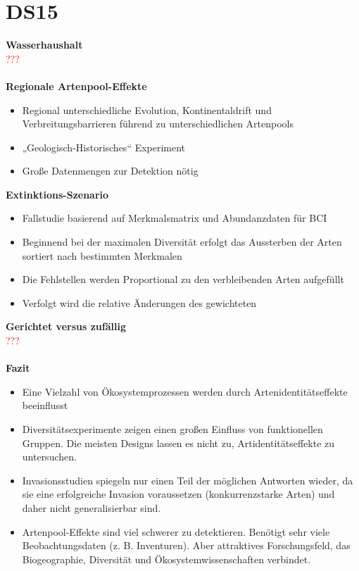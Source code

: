 \section{DS15}

\textbf{Wasserhaushalt}\\
\textcolor{red}{???}
\\\\
\textbf{Regionale Artenpool-Effekte}
\begin{itemize}
	\item Regional unterschiedliche Evolution, Kontinentaldrift und Verbreitungsbarrieren führend zu unterschiedlichen Artenpools
	\item „Geologisch-Historisches“ Experiment
	\item Große Datenmengen zur Detektion nötig
\end{itemize}

\textbf{Extinktions-Szenario}
\begin{itemize}
	\item Fallstudie basierend auf Merkmalsmatrix und Abundanzdaten für BCI
	\item Beginnend bei der maximalen Diversität erfolgt das Aussterben der Arten sortiert nach bestimmten Merkmalen
	\item Die Fehlstellen werden Proportional zu den verbleibenden Arten aufgefüllt
	\item Verfolgt wird die relative Änderungen des gewichteten
\end{itemize}

\textbf{Gerichtet versus zufällig}\\
\textcolor{red}{???}
\\\\
\textbf{Fazit}
\begin{itemize}
	\item Eine Vielzahl von Ökosystemprozessen werden durch Artenidentitätseffekte beeinflusst
	\item Diversitätsexperimente zeigen einen großen Einfluss von funktionellen Gruppen. Die meisten Designs lassen es nicht zu, Artidentitätseffekte zu untersuchen.
	\item Invasionsstudien spiegeln nur einen Teil der möglichen Antworten wieder, da sie eine erfolgreiche Invasion voraussetzen (konkurrenzstarke Arten) und daher nicht generalisierbar sind.
	\item Artenpool-Effekte sind viel schwerer zu detektieren. Benötigt sehr viele Beobachtungsdaten (z. B. Inventuren). Aber attraktives Forschungsfeld, das Biogeographie, Diversität und Ökosystemwissenschaften verbindet.
\end{itemize}